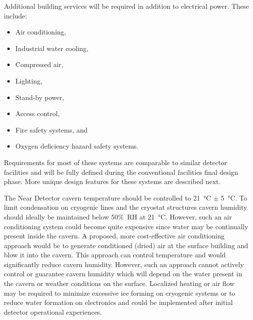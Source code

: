 Additional building services will be required in addition to electrical power. These include:
\begin{itemize}[noitemsep,topsep=-10pt]
\item Air conditioning,
\item Industrial water cooling,
\item Compressed air,
\item Lighting,
\item Stand-by power,
\item Access control,
\item Fire safety systems, and
\item Oxygen deficiency hazard safety systems.
\end{itemize}
Requirements for most of these systems are comparable to similar detector facilities and will be fully defined during the conventional facilities final design phase. More unique design features for these systems are described next.

The Near Detector cavern temperature should be controlled to \SI{21}{\celsius} $\pm$ \SI{5}{\celsius}. To limit condensation on cryogenic lines and the cryostat structures cavern humidity should ideally be maintained below 50$\%$~RH at \SI{21}{\celsius}. However, such an air conditioning system could become quite expensive since water may be continually present inside the cavern. A proposed, more cost-effective air conditioning approach would be to generate conditioned (dried) air at the surface building and blow it into the cavern. This approach can control temperature and would significantly reduce cavern humidity. However, such an approach cannot actively control or guarantee cavern humidity which will depend on the water present in the cavern or weather conditions on the surface. Localized heating or air flow may be required to minimize excessive ice forming on cryogenic systems or to reduce water formation on electronics and could be implemented after initial detector operational experiences.

